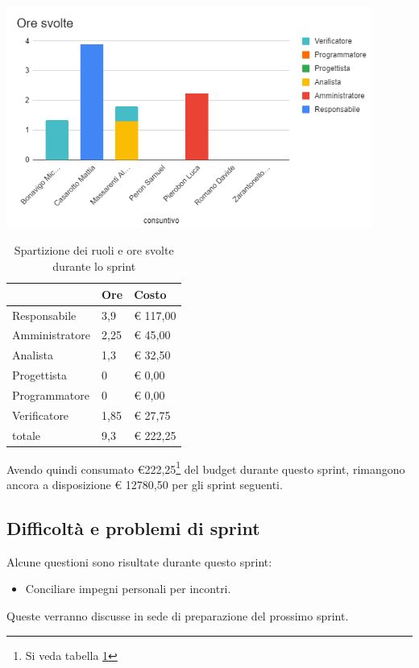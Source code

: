 \begin{center}
\includegraphics[width=12cm]{img/ore-svolte.png}
\end{center}

\begin{table}[ht]
    \begin{tabularx}{\linewidth}{X|l|l}
    \rowcolor{gray!30}& Ore & Costo \\
    \hline
    
    Responsabile & 3,9 & € 117,00 \\
    \rowcolor{gray!10}Amministratore & 2,25 & € 45,00 \\
    Analista & 1,3 & € 32,50 \\
    \rowcolor{gray!10}Progettista & 0 & € 0,00 \\
    Programmatore & 0 & € 0,00 \\
    \rowcolor{gray!10}Verificatore & 1,85 &€ 27,75 \\
    totale & 9,3 & € 222,25 \\
    \end{tabularx}
    \caption{\label{costi-ruolo}Spartizione dei ruoli e ore svolte durante lo sprint}
\end{table}


Avendo quindi consumato €222,25\footnote{Si veda tabella \ref{costi-ruolo}} del budget durante questo sprint, rimangono ancora a disposizione € 12780,50 per gli sprint seguenti.

\subsection{Difficoltà e problemi di sprint}

Alcune questioni sono risultate durante questo sprint:

\begin{itemize}
    \item Conciliare impegni personali per incontri.
\end{itemize}

Queste verranno discusse in sede di preparazione del prossimo sprint.
